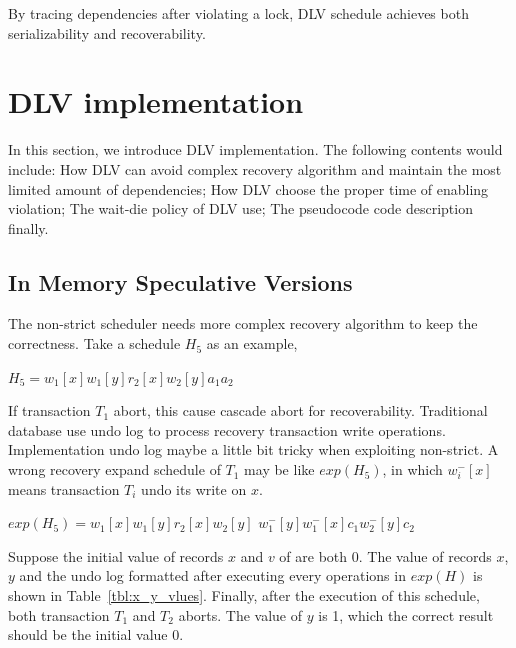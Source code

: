 \documentclass[conference]{IEEEtran}
\begin{document}
By tracing dependencies after violating a lock, DLV schedule achieves both serializability and recoverability.

\section{DLV implementation}
\label{sec:implement}

In this section, we introduce DLV implementation. 
The following contents would include:
How DLV can avoid complex recovery algorithm and maintain the most limited amount of dependencies;
How DLV choose the proper time of enabling violation;
The wait-die policy of DLV use;
The pseudocode code description finally.

\subsection {In Memory Speculative Versions}

The non-strict scheduler needs more complex recovery algorithm to keep the correctness.
Take a schedule ${H_5}$ as an example,

\begin{center}
${H_5 = w_1[x]w_1[y]r_2[x]w_2[y]a_1a_2}$
\end{center}

If transaction ${T_1}$ abort, this cause cascade abort for recoverability.
Traditional database use undo log to process recovery transaction write operations.
Implementation undo log maybe a little bit tricky when exploiting non-strict.
A wrong recovery expand schedule of ${T_1}$ may be like ${exp(H_5)}$,
in which ${w^-_i[x]}$ means transaction ${T_i}$ undo its write on ${x}$.

\begin{center}
  ${exp(H_5) =  w_1[x]w_1[y]r_2[x]w_2[y]}$
  ${w^-_1[y]w^-_1[x]c_1w^-_2[y]c_2}$
\end{center}

Suppose the initial value of records ${x}$ and ${v}$ of are both 0. 
The value of records ${x}$, ${y}$ and the undo log formatted after executing every operations in $exp(H)$ is shown in Table~\ref{tbl:x_y_vlues}.
Finally, after the execution of this schedule, both transaction ${T_1}$ and ${T_2}$ aborts.
The value of ${y}$ is 1, which the correct result should be the initial value 0.
\end{document}

